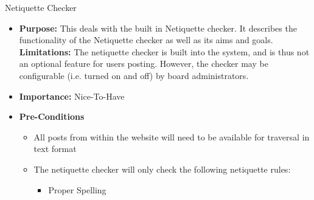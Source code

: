\documentclass[11pt]{article}
\begin{document}
\begin{enumerate}
{
\graphicspath{ {../Diagrams/Tienie/Netiquette/} }
\newpage
\item Netiquette Checker 
\begin{itemize}
\item \textbf{Purpose: }
This deals with the built in Netiquette checker. It describes the functionality of the Netiquette checker as well as its aims and goals.
\newline
\textbf{Limitations:} 
The netiquette checker is built into the system, and is thus not an optional feature for users posting. However, the checker may be configurable (i.e. turned on and off) by board administrators.
\item 	\textbf{Importance: } Nice-To-Have
	\item	\textbf{Pre-Conditions}
		\begin{itemize}
	  		\item All posts from within the website will need to be available for traversal in text format
	  		\item The netiquette checker will only check the following netiquette rules:
	  		\begin{itemize}
	  			\item Proper Spelling

\end{itemize}
\end{itemize}
\end{itemize}}
\end{enumerate}
\end{document}

